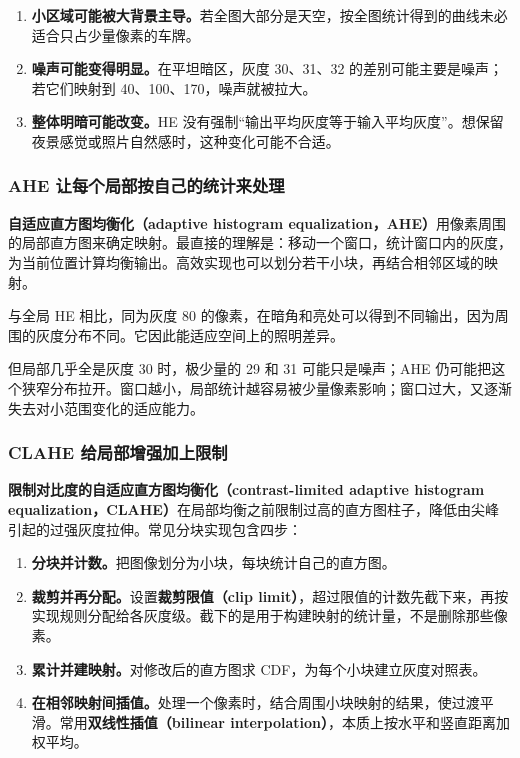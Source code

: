 \begin{enumerate}[leftmargin=*]
\item \textbf{小区域可能被大背景主导。}若全图大部分是天空，按全图统计得到的曲线未必适合只占少量像素的车牌。
\item \textbf{噪声可能变得明显。}在平坦暗区，灰度 30、31、32 的差别可能主要是噪声；若它们映射到 40、100、170，噪声就被拉大。
\item \textbf{整体明暗可能改变。}HE 没有强制“输出平均灰度等于输入平均灰度”。想保留夜景感觉或照片自然感时，这种变化可能不合适。
\end{enumerate}

\subsubsection*{AHE 让每个局部按自己的统计来处理}

\textbf{自适应直方图均衡化（adaptive histogram equalization，AHE）}用像素周围的局部直方图来确定映射。最直接的理解是：移动一个窗口，统计窗口内的灰度，为当前位置计算均衡输出。高效实现也可以划分若干小块，再结合相邻区域的映射。

与全局 HE 相比，同为灰度 80 的像素，在暗角和亮处可以得到不同输出，因为周围的灰度分布不同。它因此能适应空间上的照明差异。

但局部几乎全是灰度 30 时，极少量的 29 和 31 可能只是噪声；AHE 仍可能把这个狭窄分布拉开。窗口越小，局部统计越容易被少量像素影响；窗口过大，又逐渐失去对小范围变化的适应能力。

\subsubsection*{CLAHE 给局部增强加上限制}

\textbf{限制对比度的自适应直方图均衡化（contrast-limited adaptive histogram equalization，CLAHE）}在局部均衡之前限制过高的直方图柱子，降低由尖峰引起的过强灰度拉伸。常见分块实现包含四步：
\begin{enumerate}[leftmargin=*]
\item \textbf{分块并计数。}把图像划分为小块，每块统计自己的直方图。
\item \textbf{裁剪并再分配。}设置\textbf{裁剪限值（clip limit）}，超过限值的计数先截下来，再按实现规则分配给各灰度级。截下的是用于构建映射的统计量，不是删除那些像素。
\item \textbf{累计并建映射。}对修改后的直方图求 CDF，为每个小块建立灰度对照表。
\item \textbf{在相邻映射间插值。}处理一个像素时，结合周围小块映射的结果，使过渡平滑。常用\textbf{双线性插值（bilinear interpolation）}，本质上按水平和竖直距离加权平均。
\end{enumerate}

